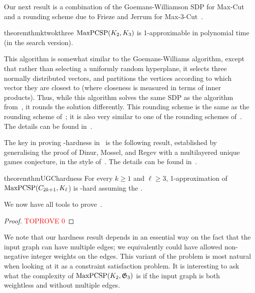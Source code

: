 \documentclass[a4paper,11pt, DIV=11]{scrartcl}
\renewcommand{\G}{\ensuremath{\mathfrak{G}}}
\DeclareMathOperator{\maxPCSP}{\textup{MaxPCSP}}
\theoremstyle{plain}
\theoremstyle{definition}
\begin{document}
\medskip
Our next result is a combination of
the Goemans-Williamson SDP for Max-Cut~\cite{GW95} and a rounding scheme due to Frieze
and Jerrum for Max-3-Cut~\cite{FJ97}.

\begin{restatable}{theorem}{thmktwokthree}\label{thm:k2k3}
$\maxPCSP(K_2, K_3)$ is 1-approximable in polynomial time (in the search version).
\end{restatable}

This algorithm is somewhat similar to the Goemans-Williams algorithm, except
that rather than selecting a uniformly random hyperplane, it selects three
normally distributed vectors, and partitions the vertices according to which
vector they are closest to (where closeness is measured in terms of inner
products). Thus, while this algorithm solves the same SDP as the algorithm
from~, it rounds the solution differently. This rounding scheme is the same as the rounding scheme of~\cite{FJ97}; it is also very similar to one of the rounding schemes of~\cite{Karger98:jacm}. The details can be
found in~.

\medskip

The key in proving \NP-hardness in~ is the following
result, established by generalising the proof of Dinur, Mossel, and
Regev\cite{Dinur09:sicomp} with a multilayered unique games conjecture, in the
style of~\cite{BWZ21}. The details can be found in~.

\begin{restatable}{theorem}{thmUGChardness} \label{thm:ugcHardness}
    For every $k\geq 1$ and $\ell \geq 3$, 1-approximation of $\maxPCSP(C_{2k+1},
    K_\ell$) is \NP-hard assuming the \UGC.
\end{restatable}

We now have all tools to prove~.

\begin{proof}\textcolor{red}{TOPROVE 0}\end{proof}

We note that our hardness result depends in an essential way on the fact that the input graph can have multiple edges; we equivalently could have allowed non-negative integer weights on the edges. This variant of the problem is most natural when looking at it as a constraint satisfaction problem. It is  interesting to ask what the complexity of $\maxPCSP(K_2, \G_3)$ is if the input graph is  both weightless and without multiple edges.
\end{document}
